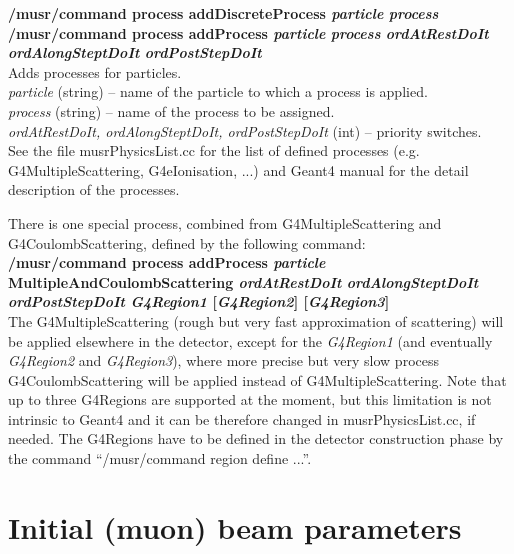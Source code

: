 \documentclass[twoside]{dis04}
\begin{document}
\begin{description}
\item{\bf /musr/command process addDiscreteProcess \emph{particle} \emph{process}}\\
{\bf /musr/command process addProcess \emph{particle} \emph{process} \emph{ordAtRestDoIt} \emph{ordAlongSteptDoIt} \emph{ordPostStepDoIt}}\\
	Adds processes for particles. \\
	\emph{particle} (string) -- name of the particle to which a process is applied.\\
	\emph{process} (string) -- name of the process to be assigned.\\
	\emph{ordAtRestDoIt, ordAlongSteptDoIt, ordPostStepDoIt} (int) -- priority switches.\\
	See the file musrPhysicsList.cc for the list of defined processes (e.g. G4MultipleScattering,
	G4eIonisation, ...) and Geant4 manual for the detail description of the processes.

	There is one special process, combined from G4MultipleScattering and G4CoulombScattering,
	defined by the following command:\\
{\bf /musr/command process addProcess  \emph{particle} MultipleAndCoulombScattering \emph{ordAtRestDoIt} \emph{ordAlongSteptDoIt} \emph{ordPostStepDoIt} \emph{G4Region1}  [\emph{G4Region2}]  [\emph{G4Region3}]}\\
	The G4MultipleScattering (rough but very fast approximation of scattering) will be applied
	elsewhere in the detector, except for the \emph{G4Region1} (and eventually \emph{G4Region2}
	and \emph{G4Region3}), where more precise but very slow process G4CoulombScattering
	will be applied instead of G4MultipleScattering.  Note that up to three
	G4Regions are supported at the moment, but this limitation is not intrinsic to {\sc Geant4}
	and it can be therefore changed in musrPhysicsList.cc, if needed.  The G4Regions have to
	be defined in the detector construction phase by the command ``/musr/command region define ...''.

\end{description}

\section{Initial (muon) beam parameters}
\end{document}
